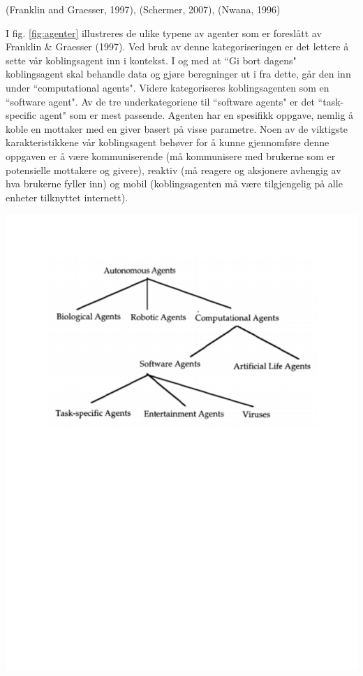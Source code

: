 (Franklin and Graesser, 1997)\cite{agent}, (Schermer, 2007)\cite{schermer}, (Nwana, 1996)\cite{nwana}

I fig. \ref{fig:agenter} illustreres de ulike typene av agenter som er foreslått av Franklin \& Graesser (1997)\cite{agent}. Ved bruk av denne kategoriseringen er det lettere å sette vår koblingsagent inn i kontekst. I og med at ``Gi bort dagens" koblingsagent skal behandle data og gjøre beregninger ut i fra dette, går den inn under ``computational agents". Videre kategoriseres koblingsagenten som en ``software agent". Av de tre underkategoriene til ``software agents" er det ``task-specific agent" som er mest passende. Agenten har en spesifikk oppgave, nemlig å koble en mottaker med en giver basert på visse parametre. Noen av de viktigste karakteristikkene vår koblingsagent behøver for å kunne gjennomføre denne oppgaven er å være kommuniserende (må kommunisere med brukerne som er potensielle mottakere og givere), reaktiv (må reagere og aksjonere avhengig av hva brukerne fyller inn) og mobil (koblingsagenten må være tilgjengelig på alle enheter tilknyttet internett).


\begin{center}
\includegraphics[clip=true, width=1 \textwidth,
trim=0cm 14cm 0cm 1.5cm]{agenter.pdf}
\label{fig:agenter}
\end{center}

